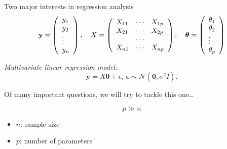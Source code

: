 \documentclass[
  ignorenonframetext,
  aspectratio=169]{beamer}
\begin{document}
\begin{frame}{Two major interests in regression analysis}
\protect\hypertarget{two-major-interests-in-regression-analysis}{}
\[
\mathbf{y} = \left(\begin{array}{l}
y_{1}\\
y_{2}\\
\vdots\\
y_{n}
\end{array}\right),\quad
X = \left(\begin{array}{l l l}
X_{11} & \cdots & X_{1p} \\
X_{21} & \cdots & X_{2p} \\
 & \cdots & \\
X_{n1} & \cdots & X_{np} \\
\end{array}\right),\quad
\boldsymbol{\theta} = \left(\begin{array}{l}
\theta_{1}\\
\theta_{2}\\
\vdots\\
\theta_{p}
\end{array}\right)
\]

\vfill

\emph{Multivariate linear regression model:} \[
\mathbf{y} = X \boldsymbol{\theta} + \epsilon,\, \boldsymbol{\epsilon} \sim \mathcal{N}\!\left(\mathbf{0}, \sigma^{2}I\right).
\]

\vfill


\end{frame}

\begin{frame}{Of many important questions, we will try to tackle this
one\ldots{}}
\protect\hypertarget{of-many-important-questions-we-will-try-to-tackle-this-one}{}
\Huge

\[p \gg n\]

\vfill

\normalsize

\begin{itemize}
\item
  \(n\): sample size
\item
  \(p\): number of parameters
\end{itemize}
\end{frame}
\end{document}

